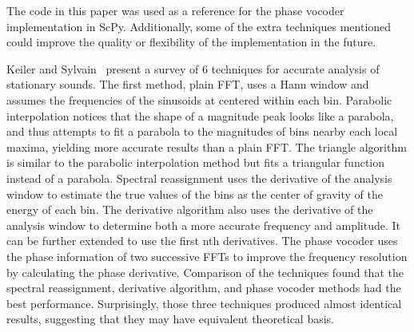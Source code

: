 \documentclass{article}
\begin{document}
The code in this paper was used as a reference for the phase vocoder implementation in ScPy.
Additionally, some of the extra techniques mentioned could improve the quality or flexibility of
the implementation in the future.
\\\par
Keiler and Sylvain~\cite{keiler2002survey} present a survey of 6 techniques for accurate analysis
of stationary sounds. The first method, plain FFT, uses a Hann window and assumes the frequencies
of the sinusoids at centered within each bin. Parabolic interpolation notices that the shape of a
magnitude peak looks like a parabola, and thus attempts to fit a parabola to the magnitudes of bins
nearby each local maxima, yielding more accurate results than a plain FFT\@. The triangle algorithm
is similar to the parabolic interpolation method but fits a triangular function instead of a
parabola. Spectral reassignment uses the derivative of the analysis window to estimate the true
values of the bins as the center of gravity of the energy of each bin. The derivative algorithm
also uses the derivative of the analysis window to determine both a more accurate frequency and
amplitude. It can be further extended to use the first nth derivatives. The phase vocoder uses the
phase information of two successive FFTs to improve the frequency resolution by calculating the
phase derivative. Comparison of the techniques found that the spectral reassignment, derivative
algorithm, and phase vocoder methods had the best performance. Surprisingly, those three techniques
produced almost identical results, suggesting that they may have equivalent theoretical basis.
\end{document}
